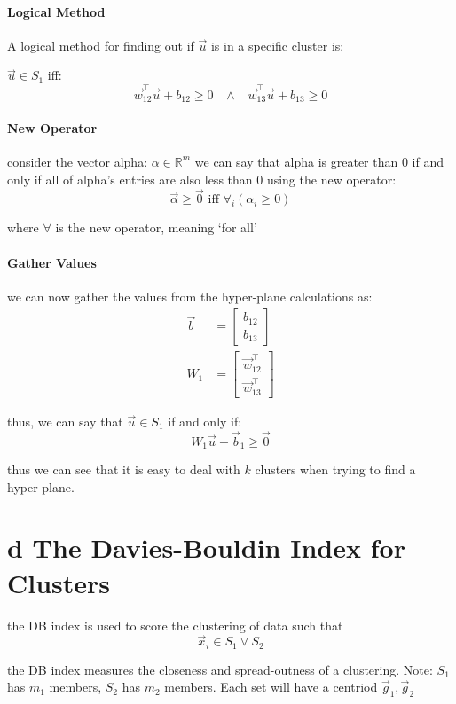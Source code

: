 \documentclass[12pt]{book}
\begin{document}
\paragraph{Logical Method}
A logical method for finding out if $\vec u$ is in a specific cluster is:

$\vec u \in S_1$ iff:
\[\vec w_{12}^\top \vec u + b_{12} \geq 0\;\;\;\wedge\;\;\;\vec w_{13}^\top \vec u + b_{13} \geq 0\]

\paragraph{New Operator}
consider the vector alpha: $\alpha \in \mathbb{R}^m$
we can say that alpha is greater than 0 if and only if all of alpha's entries are
also less than 0 using the new operator:
\[\vec \alpha \geq \vec 0 \text{ iff } \forall_i(\alpha_i \geq 0)\]

where $\forall$ is the new operator, meaning `for all'

\paragraph{Gather Values}
we can now gather the values from the hyper-plane calculations as:
\begin{align*}
        \vec b &= \begin{bmatrix} b_{12}\\b_{13} \end{bmatrix}\\
        W_1 &= \begin{bmatrix} \vec w_{12}^\top \\ \vec w_{13}^\top \end{bmatrix}
\end{align*}

thus, we can say that $\vec u \in S_1$ if and only if:
\[W_1\vec u + \vec b_1 \geq \vec 0\]

thus we can see that it is easy to deal with $k$ clusters when trying to find a 
hyper-plane.

\section*{d The Davies-Bouldin Index for Clusters}
the DB index is used to score the clustering of data such that 
\[\vec x_i \in S_1 \vee S_2 \]

the DB index measures the closeness and spread-outness 
of a clustering.
Note: $S_1$ has $m_1$ members, $S_2$ has $m_2$ members. Each set will
have a centriod $\vec g_1, \vec g_2$
\end{document}

